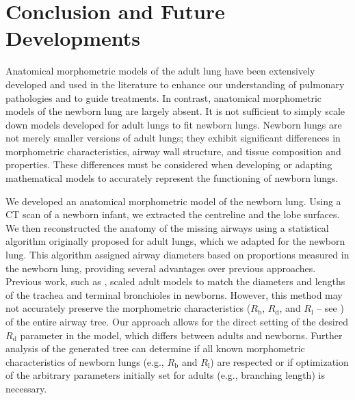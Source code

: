 

\section{Conclusion and Future Developments}
\label{sec:conclusion_and_future_developments}


Anatomical morphometric models of the adult lung have been extensively
developed and used in the literature to enhance our understanding of
pulmonary pathologies and to guide treatments. In contrast, anatomical
morphometric models of the newborn lung are largely absent. It is not
sufficient to simply scale down models developed for adult lungs to
fit newborn lungs. Newborn lungs are not merely smaller versions of
adult lungs; they exhibit significant differences in morphometric
characteristics, airway wall structure, and tissue composition and
properties. These differences must be considered when developing or
adapting mathematical models to accurately represent the functioning
of newborn lungs.

We developed an anatomical morphometric model of the newborn
lung. Using a CT scan of a newborn infant, we extracted the centreline
and the lobe surfaces. We then reconstructed the anatomy of the
missing airways using a statistical algorithm originally proposed for
adult lungs, which we adapted for the newborn lung. This algorithm
assigned airway diameters based on proportions measured in the newborn
lung, providing several advantages over previous approaches. Previous
work, such as \textcite{mani2020}, scaled adult models to match the
diameters and lengths of the trachea and terminal bronchioles in
newborns. However, this method may not accurately preserve the
morphometric characteristics ($R_{\text{b}}$, $R_{\text{d}}$, and
$R_{\text{l}}$ – see ) of the entire
airway tree. Our approach allows for the direct setting of the desired
$R_{\text{d}}$ parameter in the model, which differs between adults
and newborns. Further analysis of the generated tree can determine if
all known morphometric characteristics of newborn lungs (e.g.,
$R_{\text{b}}$ and $R_{\text{l}}$) are respected or if optimization of
the arbitrary parameters initially set for adults (e.g., branching
length) is necessary.

